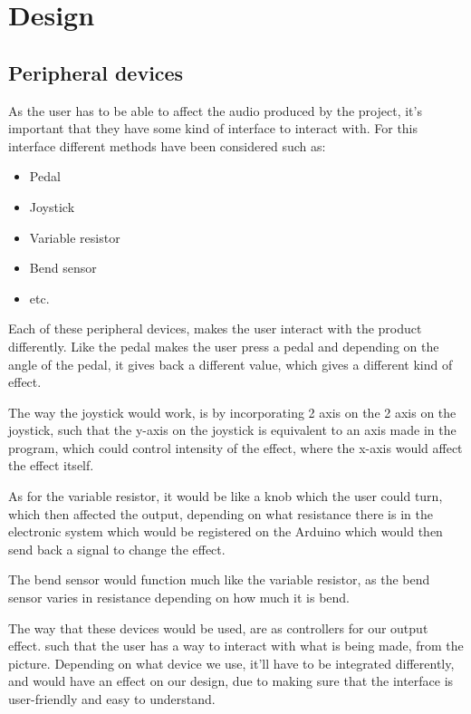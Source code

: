 \chapter{Design}\label{ch:design}

\section{Peripheral devices}
As the user has to be able to affect the audio produced by the project, it's important that they have some kind of interface to interact with. For this interface different methods have been considered such as:

\begin{itemize}
\item Pedal
\item Joystick
\item Variable resistor
\item Bend sensor
\item etc.
\end{itemize}

Each of these peripheral devices, makes the user interact with the product differently. Like the pedal makes the user press a pedal and depending on the angle of the pedal, it gives back a different value, which gives a different kind of effect.

The way the joystick would work, is by incorporating 2 axis on the 2 axis on the joystick, such that the y-axis on the joystick is equivalent to an axis made in the program, which could control intensity of the effect, where the x-axis would affect the effect itself. 

As for the variable resistor, it would be like a knob which the user could turn, which then affected the output, depending on what resistance there is in the electronic system which would be registered on the Arduino which would then send back a signal to change the effect. 

The bend sensor would function much like the variable resistor, as the bend sensor varies in resistance depending on how much it is bend.

The way that these devices would be used, are as controllers for our output effect. such that the user has a way to interact with what is being made, from the picture. Depending on what device we use, it'll have to be integrated differently, and would have an effect on our design, due to making sure that the interface is user-friendly and easy to understand. 

